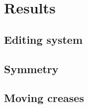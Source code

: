 \section{Results} \label{sec:results}
\subsection{Editing system}
\subsection{Symmetry}
\subsection{Moving creases}